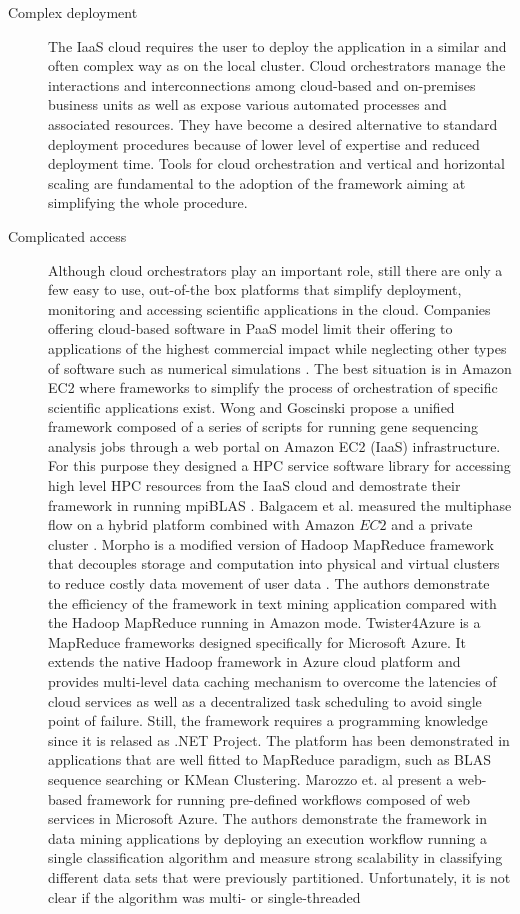 \documentclass[3p,times]{elsarticle}
\begin{document}
\begin{description}
\item[Complex deployment] The IaaS cloud requires the user to deploy the application in a similar and often complex way as on the local cluster. Cloud orchestrators manage the interactions and interconnections among cloud-based and on-premises business units as well as expose various automated processes and associated resources. They have become a desired alternative to standard deployment procedures because of lower level of expertise and reduced deployment time. Tools for cloud orchestration and vertical and horizontal scaling are fundamental to the adoption of the framework aiming at simplifying the whole procedure.

\item[Complicated access] Although cloud orchestrators play an important role, still there are only a few easy to use, out-of-the box platforms that simplify deployment, monitoring and accessing scientific applications in the cloud. Companies offering cloud-based software in PaaS model limit their offering to applications of the highest commercial impact while neglecting other types of software such as numerical simulations \cite{CloudStack} \cite{OpenStack}. The best situation is in Amazon EC2 where frameworks to simplify the process of orchestration of specific scientific applications exist. Wong and Goscinski propose a unified framework composed of a series of scripts for running gene sequencing analysis jobs through a web portal \cite{Wong2013} on Amazon EC2 (IaaS) infrastructure. For this purpose they designed a HPC service software library for accessing high level HPC resources from the IaaS cloud and demostrate their framework in running mpiBLAS \cite{mpiBlas}. Balgacem et al. measured the multiphase flow on a hybrid platform combined with Amazon $EC2$ and a private cluster \cite{BenBelgacem2015}. Morpho is a modified version of Hadoop MapReduce framework that decouples storage and computation into physical and virtual clusters to reduce costly data movement of user data \cite{Lu2014}. The authors demonstrate the efficiency of the  framework in text mining application compared with the Hadoop MapReduce running in Amazon mode. Twister4Azure is a MapReduce frameworks designed specifically for Microsoft Azure. It extends the native Hadoop framework in Azure cloud platform and provides multi-level data caching mechanism to overcome the latencies of cloud services as well as a decentralized task scheduling to avoid single point of failure. Still, the framework requires a programming knowledge since it is relased as .NET Project. The platform has been demonstrated in applications that are well fitted to MapReduce paradigm, such as BLAS sequence searching or KMean Clustering. Marozzo et. al \cite{catlett2013cloud} present a web-based framework for running pre-defined workflows composed of web services in Microsoft Azure. The authors demonstrate the framework in data mining applications by deploying an execution workflow running a single classification algorithm and measure strong scalability in classifying different data sets that were previously partitioned. Unfortunately, it is not clear if the algorithm was multi- or single-threaded 
\end{description}
\end{document}
